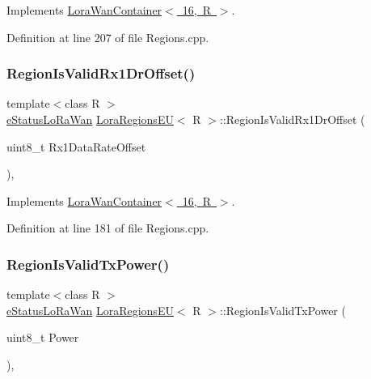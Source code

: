 Implements \mbox{\hyperlink{class_lora_wan_container_a14be092c3440b0bbfe9683f14c648eb2}{Lora\+Wan\+Container$<$ 16, R $>$}}.



Definition at line 207 of file Regions.\+cpp.

\mbox{\label{class_lora_regions_e_u_a6dc681bc39f00825ed46e9636d9acf52}} 
\subsubsection{\texorpdfstring{Region\+Is\+Valid\+Rx1\+Dr\+Offset()}{RegionIsValidRx1DrOffset()}}
{\footnotesize\ttfamily template$<$class R $>$ \\
\mbox{\hyperlink{_define_8h_a1cea710adbbf5b02bced8f79cd82f7b9}{e\+Status\+Lo\+Ra\+Wan}} \mbox{\hyperlink{class_lora_regions_e_u}{Lora\+Regions\+EU}}$<$ R $>$\+::Region\+Is\+Valid\+Rx1\+Dr\+Offset (\begin{DoxyParamCaption}\item[{uint8\+\_\+t}]{Rx1\+Data\+Rate\+Offset }\end{DoxyParamCaption})\hspace{0.3cm}{\ttfamily [protected]}, {\ttfamily [virtual]}}



Implements \mbox{\hyperlink{class_lora_wan_container_ac5d3abcc857b6b1f0535e12915dd2bfb}{Lora\+Wan\+Container$<$ 16, R $>$}}.



Definition at line 181 of file Regions.\+cpp.

\mbox{\label{class_lora_regions_e_u_ac28aa9ff150676c7f1dd7425dbb6fffa}} 
\subsubsection{\texorpdfstring{Region\+Is\+Valid\+Tx\+Power()}{RegionIsValidTxPower()}}
{\footnotesize\ttfamily template$<$class R $>$ \\
\mbox{\hyperlink{_define_8h_a1cea710adbbf5b02bced8f79cd82f7b9}{e\+Status\+Lo\+Ra\+Wan}} \mbox{\hyperlink{class_lora_regions_e_u}{Lora\+Regions\+EU}}$<$ R $>$\+::Region\+Is\+Valid\+Tx\+Power (\begin{DoxyParamCaption}\item[{uint8\+\_\+t}]{Power }\end{DoxyParamCaption})\hspace{0.3cm}{\ttfamily [protected]}, {\ttfamily [virtual]}}



